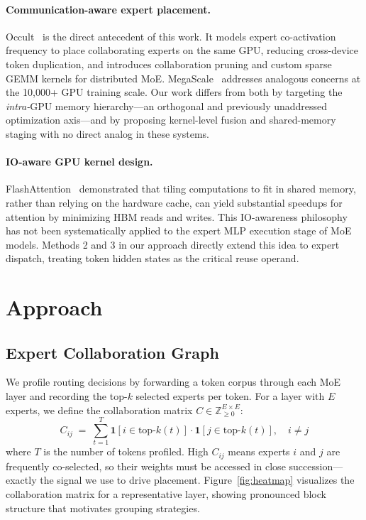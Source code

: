 \documentclass{article}
\begin{document}
\paragraph{Communication-aware expert placement.}
Occult~\citep{luo2025occult} is the direct antecedent of this work.
It models expert co-activation frequency to place collaborating experts on the same
GPU, reducing cross-device token duplication, and introduces collaboration pruning
and custom sparse GEMM kernels for distributed MoE.
MegaScale~\citep{jiang2024megascale} addresses analogous concerns at the 10{,}000+
GPU training scale.
Our work differs from both by targeting the \emph{intra-}GPU memory hierarchy—an
orthogonal and previously unaddressed optimization axis—and by proposing kernel-level
fusion and shared-memory staging with no direct analog in these systems.
 
\paragraph{IO-aware GPU kernel design.}
FlashAttention~\citep{dao2022flashattention} demonstrated that tiling computations
to fit in shared memory, rather than relying on the hardware cache, can yield
substantial speedups for attention by minimizing HBM reads and writes.
This IO-awareness philosophy has not been systematically applied to the expert MLP
execution stage of MoE models.
Methods 2 and 3 in our approach directly extend this idea to expert dispatch, treating
token hidden states as the critical reuse operand.
 
\section{Approach}
 
\subsection{Expert Collaboration Graph}
 
We profile routing decisions by forwarding a token corpus through each MoE layer and
recording the top-$k$ selected experts per token.
For a layer with $E$ experts, we define the collaboration matrix
$C \in \mathbb{Z}_{\geq 0}^{E \times E}$:
\begin{equation}
    C_{ij} \;=\; \sum_{t=1}^{T}
        \mathbf{1}\!\left[i \in \mathrm{top\text{-}}k(t)\right]
        \cdot
        \mathbf{1}\!\left[j \in \mathrm{top\text{-}}k(t)\right],
        \quad i \neq j
    \label{eq:collab}
\end{equation}
where $T$ is the number of tokens profiled.
High $C_{ij}$ means experts $i$ and $j$ are frequently co-selected, so their weights
must be accessed in close succession—exactly the signal we use to drive placement.
Figure~\ref{fig:heatmap} visualizes the collaboration matrix for a representative layer,
showing pronounced block structure that motivates grouping strategies.
 
\end{document}
